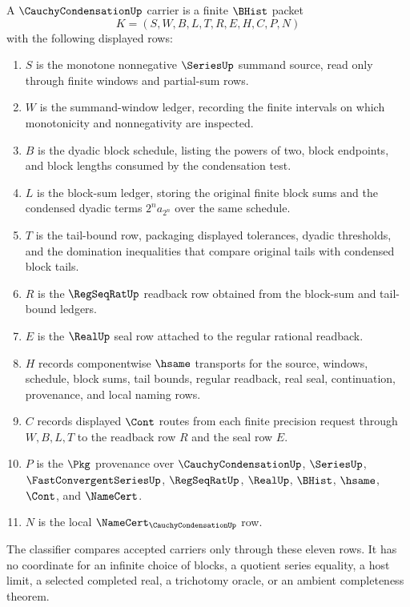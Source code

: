 \begin{definition}
\label{def:cauchy-condensation-carrier}
A $\CauchyCondensationUp$ carrier is a finite $\BHist$ packet
$$
K=(S,W,B,L,T,R,E,H,C,P,N)
$$
with the following displayed rows:
\begin{enumerate}
\item $S$ is the monotone nonnegative $\SeriesUp$ summand source, read only through finite windows and partial-sum rows.
\item $W$ is the summand-window ledger, recording the finite intervals on which monotonicity and nonnegativity are inspected.
\item $B$ is the dyadic block schedule, listing the powers of two, block endpoints, and block lengths consumed by the condensation test.
\item $L$ is the block-sum ledger, storing the original finite block sums and the condensed dyadic terms $2^n a_{2^n}$ over the same schedule.
\item $T$ is the tail-bound row, packaging displayed tolerances, dyadic thresholds, and the domination inequalities that compare original tails with condensed block tails.
\item $R$ is the $\RegSeqRatUp$ readback row obtained from the block-sum and tail-bound ledgers.
\item $E$ is the $\RealUp$ seal row attached to the regular rational readback.
\item $H$ records componentwise $\hsame$ transports for the source, windows, schedule, block sums, tail bounds, regular readback, real seal, continuation, provenance, and local naming rows.
\item $C$ records displayed $\Cont$ routes from each finite precision request through $W,B,L,T$ to the readback row $R$ and the seal row $E$.
\item $P$ is the $\Pkg$ provenance over $\CauchyCondensationUp$, $\SeriesUp$, $\FastConvergentSeriesUp$, $\RegSeqRatUp$, $\RealUp$, $\BHist$, $\hsame$, $\Cont$, and $\NameCert$.
\item $N$ is the local $\NameCert_{\CauchyCondensationUp}$ row.
\end{enumerate}
The classifier compares accepted carriers only through these eleven rows. It has no coordinate for an infinite choice of blocks, a quotient series equality, a host limit, a selected completed real, a trichotomy oracle, or an ambient completeness theorem.
\end{definition}


